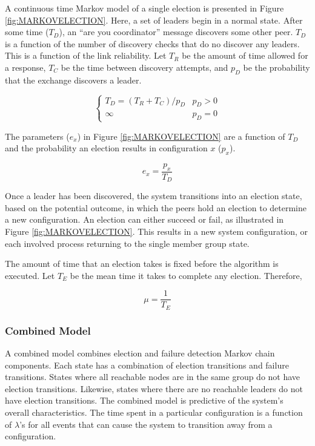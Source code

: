 A continuous time Markov model of a single election is presented in Figure \ref{fig:MARKOVELECTION}.
Here, a set of leaders begin in a normal state.
After some time ($T_{D}$), an ``are you coordinator'' message discovers some other peer.
$T_{D}$ is a function of the number of discovery checks that do no discover any leaders. 
This is a function of the link reliability.
Let $T_{R}$ be the amount of time allowed for a response, $T_{C}$ be the time between
discovery attempts, and $p_{D}$ be the probability that the exchange discovers a leader.

\begin{equation}
\begin{cases}
T_{D} = ( T_{R}+T_{C} ) / p_{D} & p_{D} > 0 \\
\infty & p_{D} = 0
\end{cases}
\end{equation}

The parameters ($e_x$) in Figure \ref{fig:MARKOVELECTION} are a function of $T_{D}$ and the probability an election results in configuration $x$ ($p_{x}$).

\begin{equation}
e_x = \frac{p_{x}}{T_{D}}
\end{equation}

Once a leader has been discovered, the system transitions into an election state, based on the potential outcome, in which the peers hold an election to determine a new configuration.
An election can either succeed or fail, as illustrated in Figure \ref{fig:MARKOVELECTION}. 
This results in a new system configuration, or each involved process returning to the single member group state.
 
The amount of time that an election takes is fixed before the algorithm is executed. 
Let $T_{E}$ be the mean time it takes to complete any election. Therefore,

\begin{equation}
\mu = \frac{1}{T_{E}}
\end{equation}

\subsubsection{Combined Model}

A combined model combines election and failure detection Markov chain components.
Each state has a combination of election transitions and failure transitions.
States where all reachable nodes are in the same group do not have election transitions.
Likewise, states where there are no reachable leaders do not have election transitions.                                                        
The combined model is predictive of the system's overall characteristics.
The time spent in a particular configuration is a function of $\lambda$'s for all events that can cause the system to transition away from a configuration. 

